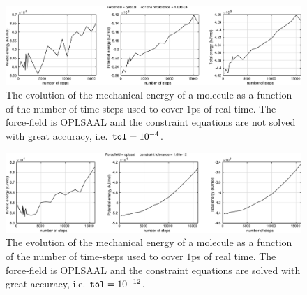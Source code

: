 \documentclass[runningheads]{llncs}
\begin{document}


\begin{figure}
  \centering
  \includegraphics[width=12cm]{oplsaaltol04.pdf}
  \caption{The evolution of the mechanical energy of a molecule as a function of the number of time-steps used to cover $1$ps of real time. The force-field is OPLSAAL and the constraint equations are not solved with great accuracy, i.e. ${\tt tol} = 10^{-4}$. } \label{fig:oplsaaltol04}
\end{figure}

\begin{figure}
  \centering
  \includegraphics[width=12cm]{oplsaaltol12.pdf}
   \caption{The evolution of the mechanical energy of a molecule as a function of the number of time-steps used to cover $1$ps of real time. The force-field is OPLSAAL and the constraint equations are solved with great accuracy, i.e. ${\tt tol} = 10^{-12}$.} \label{fig:oplsaaltol12}
\end{figure}
\end{document}
